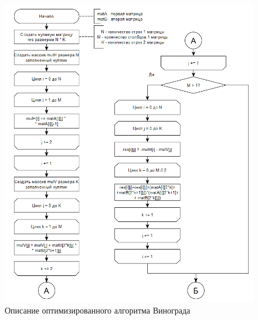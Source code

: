 \documentclass{article}
\begin{document}
\begin{figure}[h]
	\centering
	\includegraphics[scale=1]{tools/alg_3.png}
	\caption{Описание оптимизированного алгоритма Винограда}
	\label{fig:opt_vinograd_1}
\end{figure}
\end{document}
